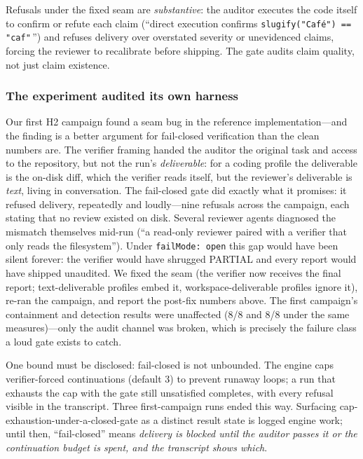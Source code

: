 \documentclass[10pt]{article}
\begin{document}
Refusals under the fixed seam are \emph{substantive}: the auditor executes the code itself to confirm
or refute each claim (``direct execution confirms \texttt{slugify("Caf\'e") == "caf"}\,'') and refuses
delivery over overstated severity or unevidenced claims, forcing the reviewer to recalibrate before
shipping. The gate audits claim quality, not just claim existence.

\subsubsection*{The experiment audited its own harness}

Our first H2 campaign found a seam bug in the reference implementation---and the finding is a better
argument for fail-closed verification than the clean numbers are. The verifier framing handed the
auditor the original task and access to the repository, but not the run's \emph{deliverable}: for a
coding profile the deliverable is the on-disk diff, which the verifier reads itself, but the
reviewer's deliverable is \emph{text}, living in conversation. The fail-closed gate did exactly what
it promises: it refused delivery, repeatedly and loudly---nine refusals across the campaign, each
stating that no review existed on disk. Several reviewer agents diagnosed the mismatch themselves
mid-run (``a read-only reviewer paired with a verifier that only reads the filesystem''). Under
\texttt{failMode: open} this gap would have been silent forever: the verifier would have shrugged
PARTIAL and every report would have shipped unaudited. We fixed the seam (the verifier now receives
the final report; text-deliverable profiles embed it, workspace-deliverable profiles ignore it),
re-ran the campaign, and report the post-fix numbers above. The first campaign's containment and
detection results were unaffected (8/8 and 8/8 under the same measures)---only the audit channel was
broken, which is precisely the failure class a loud gate exists to catch.

One bound must be disclosed: fail-closed is not unbounded. The engine caps verifier-forced
continuations (default 3) to prevent runaway loops; a run that exhausts the cap with the gate still
unsatisfied completes, with every refusal visible in the transcript. Three first-campaign runs ended
this way. Surfacing cap-exhaustion-under-a-closed-gate as a distinct result state is logged engine
work; until then, ``fail-closed'' means \emph{delivery is blocked until the auditor passes it or the
continuation budget is spent, and the transcript shows which}.
\end{document}
